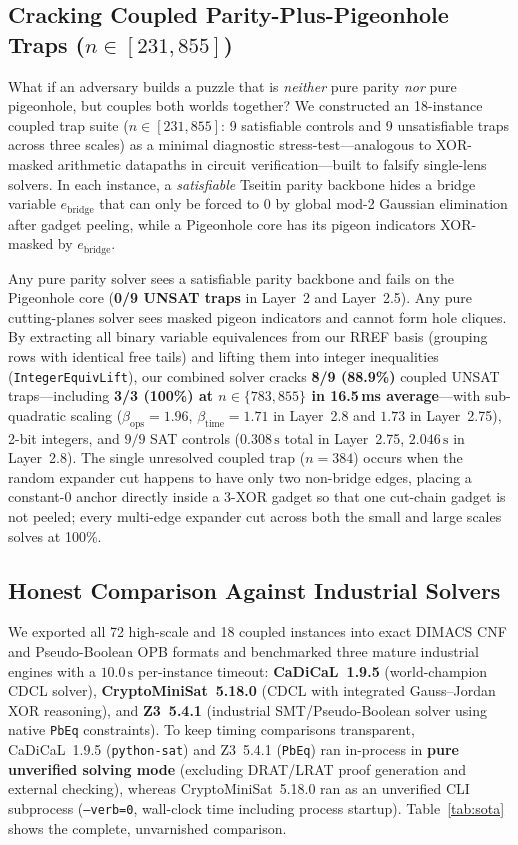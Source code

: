 \documentclass[11pt]{article}
\begin{document}
\subsection{Cracking Coupled Parity-Plus-Pigeonhole Traps (\texorpdfstring{$n \in [231, 855]$}{n in [231, 855]})}

What if an adversary builds a puzzle that is \emph{neither} pure parity \emph{nor} pure pigeonhole, but couples both worlds together? We constructed an 18-instance coupled trap suite ($n \in [231, 855]$: 9 satisfiable controls and 9 unsatisfiable traps across three scales) as a minimal diagnostic stress-test---analogous to XOR-masked arithmetic datapaths in circuit verification---built to falsify single-lens solvers. In each instance, a \emph{satisfiable} Tseitin parity backbone hides a bridge variable $e_{\text{bridge}}$ that can only be forced to $0$ by global mod-2 Gaussian elimination after gadget peeling, while a Pigeonhole core has its pigeon indicators XOR-masked by $e_{\text{bridge}}$.

Any pure parity solver sees a satisfiable parity backbone and fails on the Pigeonhole core (\textbf{0/9 UNSAT traps} in Layer~2 and Layer~2.5). Any pure cutting-planes solver sees masked pigeon indicators and cannot form hole cliques. By extracting all binary variable equivalences from our RREF basis (grouping rows with identical free tails) and lifting them into integer inequalities (\texttt{IntegerEquivLift}), our combined solver cracks \textbf{8/9 (88.9\%)} coupled UNSAT traps---including \textbf{3/3 (100\%) at $n \in \{783, 855\}$ in 16.5\,ms average}---with sub-quadratic scaling ($\beta_{\text{ops}} = 1.96$, $\beta_{\text{time}} = 1.71$ in Layer~2.8 and $1.73$ in Layer~2.75), 2-bit integers, and $9/9$ SAT controls ($0.308\,\text{s}$ total in Layer~2.75, $2.046\,\text{s}$ in Layer~2.8). The single unresolved coupled trap ($n = 384$) occurs when the random expander cut happens to have only two non-bridge edges, placing a constant-$0$ anchor directly inside a 3-XOR gadget so that one cut-chain gadget is not peeled; every multi-edge expander cut across both the small and large scales solves at 100\%.

\subsection{Honest Comparison Against Industrial Solvers}

We exported all 72 high-scale and 18 coupled instances into exact DIMACS CNF and Pseudo-Boolean OPB formats and benchmarked three mature industrial engines with a $10.0\,\text{s}$ per-instance timeout: \textbf{CaDiCaL~1.9.5} (world-champion CDCL solver), \textbf{CryptoMiniSat~5.18.0} (CDCL with integrated Gauss--Jordan XOR reasoning), and \textbf{Z3~5.4.1} (industrial SMT/Pseudo-Boolean solver using native \texttt{PbEq} constraints). To keep timing comparisons transparent, CaDiCaL~1.9.5 (\texttt{python-sat}) and Z3~5.4.1 (\texttt{PbEq}) ran in-process in \textbf{pure unverified solving mode} (excluding DRAT/LRAT proof generation and external checking), whereas CryptoMiniSat~5.18.0 ran as an unverified CLI subprocess (\texttt{--verb=0}, wall-clock time including process startup). Table~\ref{tab:sota} shows the complete, unvarnished comparison.
\end{document}
